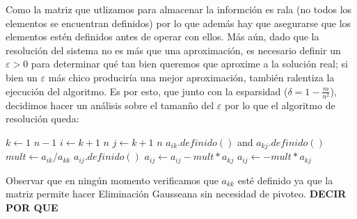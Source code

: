 \par Como la matriz que utlizamos para almacenar la informci\'on es rala (no todos los elementos se encuentran definidos) por lo que 
adem\'as hay que asegurarse que los elementos est\'en definidos antes de operar con ellos. M\'as a\'un, dado que la resoluci\'on
del sistema no es m\'as que una aproximaci\'on, es necesario definir un $\varepsilon > 0$ para determinar qu\'e tan bien queremos que 
aproxime a la soluci\'on real; si bien un $\varepsilon$ m\'as chico producir\'ia una mejor aproximaci\'on, tambi\'en ralentiza la
ejecuci\'on del algoritmo. Es por esto, que junto con la esparsidad ($\delta = 1 - \frac{m}{n^2}$), decidimos hacer un an\'alisis
sobre el taman\~no del $\varepsilon$ por lo que el algoritmo de resoluci\'on queda:

\begin{codebox}
\li \For $k \gets 1$ \To $n-1$
    \Do
\li     \For $i \gets k+1$ \To $n$
            \Do
\li         \For $j \gets k+1$ \To $n$
                \Do
\li                \If $a_{ik}.definido()$ and $a_{kj}.definido()$
                        \Then
\li                        $mult \gets a_{ik}/a_{kk}$
\li                     \If $a_{ij}.definido()$
                            \Then
\li                          $a_{ij} \gets a_{ij} - mult*a_{kj}$
\li                     \Else
\li                          $a_{ij} \gets - mult*a_{kj}$
                \End
            \End
        \End
\end{codebox}
Observar que en ning\'un momento verificamos que $a_{kk}$ est\'e definido ya que la matriz permite hacer Eliminación Gausseana sin necesidad
de pivoteo. \textbf{DECIR POR QUE}